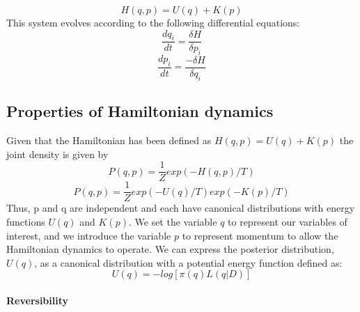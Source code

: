 \documentclass[11pt]{article}
\begin{document}

\begin{equation}
H(q,p) = U(q) + K(p)
\end{equation}
This system evolves according to the following differential equations:
\begin{equation}
\frac{dq_{i}}{dt} = \frac{\delta H}{\delta p_{i}}
\end{equation}
\begin{equation}
\frac{dp_{i}}{dt} = \frac{-\delta H}{\delta q_{i}}
\end{equation}



\subsection{Properties of Hamiltonian dynamics}



Given that the Hamiltonian has been defined as $H(q,p) = U(q) + K(p)$ the joint density is given by
\begin{equation}
P(q,p) = \frac{1}{Z}exp(-H(q,p)/T)
\end{equation}
\begin{equation}
P(q,p) = \frac{1}{Z}exp(-U(q)/T)exp(-K(p)/T)
\end{equation}
Thus, p and q are independent and each have canonical distributions with energy functions $U(q)$ and $K(p)$. We set the variable $q$ to represent our variables of interest, and we introduce the variable $p$ to represent momentum to allow the Hamiltonian dynamics to operate. We can express the posterior distribution, $U(q)$, as a canonical distribution with a potential energy function defined as:
\begin{equation}
U(q) = -log[\pi(q)L(q|D)]
\end{equation}

\paragraph{Reversibility}
\end{document}
